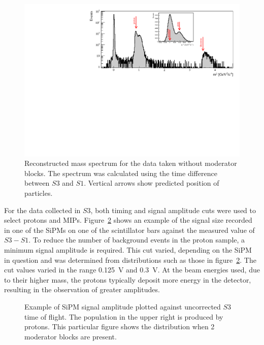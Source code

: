     \begin{figure}[h]
    \centering
    \includegraphics[width=0.9\linewidth]{files/Figures/Data_2018_8_31_b2_800MeV_0block_All.pdf}
		\caption{Reconstructed mass spectrum for the data taken without moderator blocks. The spectrum was calculated using the time difference between $S3$ and $S1$. Vertical arrows show predicted position of particles.}
		\label{fig:s3tof_mass}
	\end{figure}



    For the data collected in $S3$, both timing and signal amplitude cuts were used to select protons and MIPs.
	Figure~\ref{fig:TvsA} shows an example of the signal size recorded in one of the SiPMs on one of the scintillator bars against the measured value of $S3 - S1$.
	To reduce the number of background events in the proton sample, a minimum signal amplitude is required.
	This cut varied, depending on the SiPM in question and was determined from distributions such as those in figure~\ref{fig:TvsA}. 
	The cut values varied in the range 0.125~V and 0.3~V.
	At the beam energies used, due to their higher mass, the protons typically deposit more energy in the detector, resulting in the observation of greater amplitudes.
	
	\begin{figure}[h]
		\begin{adjustbox}{max totalsize={.7\textwidth}, center}
			
		\end{adjustbox}
		\caption{Example of SiPM signal amplitude plotted against uncorrected $S3$ time of flight. The population in the upper right is produced by protons. This particular figure shows the distribution when 2 moderator blocks are present.}
		\label{fig:TvsA}
	\end{figure}
	